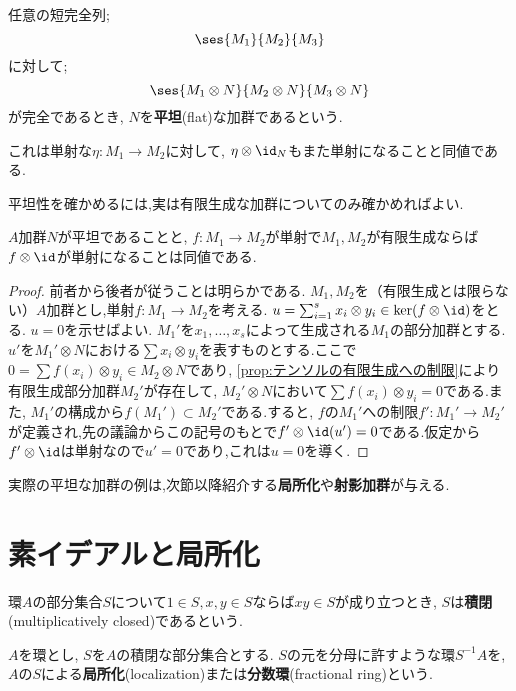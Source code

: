 \begin{defi}[平坦加群]
	任意の短完全列;
	\[\ses{M_1}{M_2}{M_3}\]
	に対して;
	\[\ses{M_1\otimes N}{M_2\otimes N}{M_3\otimes N}\]
	が完全であるとき, $N$を\textbf{平坦}(flat)な加群であるという.
\end{defi}

これは単射な$\eta:M_1\to M_2$に対して, $\eta\otimes\id_{N}$もまた単射になることと同値である.

平坦性を確かめるには,実は有限生成な加群についてのみ確かめればよい.

\begin{prop}\label{prop:平坦性は有限生成を調べれば良い}
	$A$加群$N$が平坦であることと, $f:M_1\to M_2$が単射で$M_1,M_2$が有限生成ならば$f\otimes\id$が単射になることは同値である.
\end{prop}

\begin{proof}
	前者から後者が従うことは明らかである. $M_1,M_2$を（有限生成とは限らない）$A$加群とし,単射$f:M_1\to M_2$を考える. $u=\sum_{i=1}^s x_i\otimes y_i\in\ker(f\otimes\id)$をとる. $u=0$を示せばよい. $M_1'$を$x_1,\dots,x_s$によって生成される$M_1$の部分加群とする. $u'$を$M_1'\otimes N$における$\sum x_i\otimes y_i$を表すものとする.ここで$0=\sum f(x_i)\otimes y_i\in M_2\otimes N$であり, \ref{prop:テンソルの有限生成への制限}により有限生成部分加群$M_2'$が存在して, $M_2'\otimes N$において$\sum f(x_i)\otimes y_i=0$である.また, $M_1'$の構成から$f(M_1')\subset M_2'$である.すると, $f$の$M_1'$への制限$f':M_1'\to M_2'$が定義され,先の議論からこの記号のもとで$f'\otimes\id(u')=0$である.仮定から$f'\otimes\id$は単射なので$u'=0$であり,これは$u=0$を導く.
\end{proof}

実際の平坦な加群の例は,次節以降紹介する\textbf{局所化}や\textbf{射影加群}が与える.

\section{素イデアルと局所化}

\begin{defi}[積閉集合]
	環$A$の部分集合$S$について$1\in S,x,y\in S$ならば$xy\in　S$が成り立つとき, $S$は\textbf{積閉}(multiplicatively closed)であるという.
\end{defi}

\begin{defi}[局所化]
	$A$を環とし, $S$を$A$の積閉な部分集合とする. $S$の元を分母に許すような環$S^{-1}A$を, $A$の$S$による\textbf{局所化}(localization)または\textbf{分数環}(fractional ring)という.
\end{defi}

